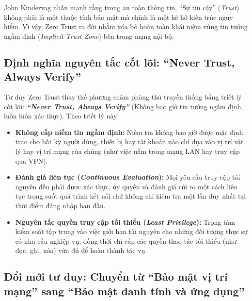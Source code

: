 John Kindervag nhấn mạnh rằng trong an toàn thông tin, ``Sự tin cậy'' (\textit{Trust}) không phải là một thuộc tính bảo mật mà chính là một kẽ hở kiến trúc nguy hiểm. Vì vậy, Zero Trust ra đời nhằm xóa bỏ hoàn toàn khái niệm vùng tin tưởng ngầm định (\textit{Implicit Trust Zone}) bên trong mạng nội bộ.

\subsection{Định nghĩa nguyên tắc cốt lõi: ``Never Trust, Always Verify''}
\label{subsec:1_3_2}

Tư duy Zero Trust thay thế phương châm phòng thủ truyền thống bằng triết lý cốt lõi: \textbf{\textit{``Never Trust, Always Verify''}} (Không bao giờ tin tưởng ngầm định, luôn luôn xác thực). Theo triết lý này:
\begin{itemize}
    \item \textbf{Không cấp niềm tin ngầm định:} Niềm tin không bao giờ được mặc định trao cho bất kỳ người dùng, thiết bị hay tài khoản nào chỉ dựa vào vị trí vật lý hay vị trí mạng của chúng (như việc nằm trong mạng LAN hay truy cập qua VPN).
    \item \textbf{Đánh giá liên tục (\textit{Continuous Evaluation}):} Mọi yêu cầu truy cập tài nguyên đều phải được xác thực, ủy quyền và đánh giá rủi ro một cách liên tục trong suốt quá trình kết nối chứ không chỉ kiểm tra một lần duy nhất tại thời điểm đăng nhập ban đầu.
    \item \textbf{Nguyên tắc quyền truy cập tối thiểu (\textit{Least Privilege}):} Trọng tâm kiểm soát tập trung vào việc giới hạn tài nguyên cho những đối tượng thực sự có nhu cầu nghiệp vụ, đồng thời chỉ cấp các quyền thao tác tối thiểu (như đọc, ghi, xóa) vừa đủ để hoàn thành tác vụ.
\end{itemize}

\subsection{Đổi mới tư duy: Chuyển từ ``Bảo mật vị trí mạng'' sang ``Bảo mật danh tính và ứng dụng''}
\label{subsec:1_3_3}

